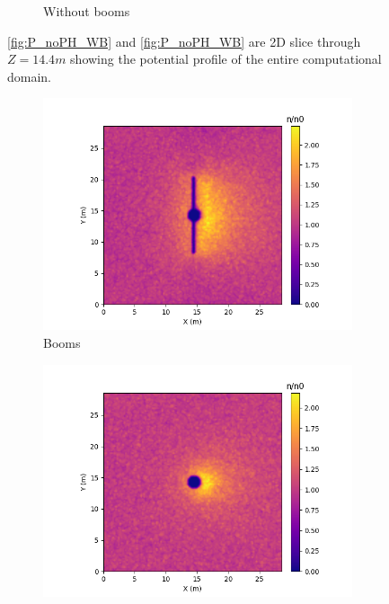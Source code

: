 \begin{center}
\begin{figure}[H]
\begin{subfigure}[b]{0.61\textwidth}
    \caption{Without booms}
    \label{fig:P_noPH_NB}
  \end{subfigure}
  \label{fig:Pot_noPH}
  \caption{\ref{fig:P_noPH_WB} and \ref{fig:P_noPH_WB} are 2D slice through $Z = 14.4 m$ showing the potential profile of the entire computational domain.}
\end{figure}
\end{center}

\begin{center}
    \begin{figure}[H]
      \begin{subfigure}[b]{0.61\textwidth}
      \includegraphics[width=\textwidth]{figures/MMO/noPH/WB/I_noPH_WB.png}
      \caption{Booms}
      \label{fig:I_noPH_WB}
    \end{subfigure}
    \begin{subfigure}[b]{0.61\textwidth}
      \includegraphics[width=\textwidth]{figures/MMO/noPH/NB/I_noPH_NB.png}

\end{subfigure}
\end{figure}
\end{center}
